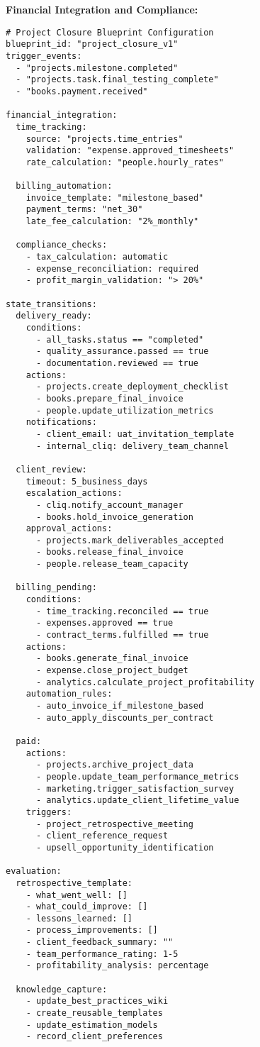 \textbf{Financial Integration and Compliance:}
\begin{verbatim}
# Project Closure Blueprint Configuration
blueprint_id: "project_closure_v1"
trigger_events:
  - "projects.milestone.completed"
  - "projects.task.final_testing_complete"
  - "books.payment.received"

financial_integration:
  time_tracking:
    source: "projects.time_entries"
    validation: "expense.approved_timesheets"
    rate_calculation: "people.hourly_rates"
  
  billing_automation:
    invoice_template: "milestone_based"
    payment_terms: "net_30"
    late_fee_calculation: "2%_monthly"
    
  compliance_checks:
    - tax_calculation: automatic
    - expense_reconciliation: required
    - profit_margin_validation: "> 20%"

state_transitions:
  delivery_ready:
    conditions:
      - all_tasks.status == "completed"
      - quality_assurance.passed == true
      - documentation.reviewed == true
    actions:
      - projects.create_deployment_checklist
      - books.prepare_final_invoice
      - people.update_utilization_metrics
    notifications:
      - client_email: uat_invitation_template
      - internal_cliq: delivery_team_channel
      
  client_review:
    timeout: 5_business_days
    escalation_actions:
      - cliq.notify_account_manager
      - books.hold_invoice_generation
    approval_actions:
      - projects.mark_deliverables_accepted
      - books.release_final_invoice
      - people.release_team_capacity
      
  billing_pending:
    conditions:
      - time_tracking.reconciled == true
      - expenses.approved == true
      - contract_terms.fulfilled == true
    actions:
      - books.generate_final_invoice
      - expense.close_project_budget
      - analytics.calculate_project_profitability
    automation_rules:
      - auto_invoice_if_milestone_based
      - auto_apply_discounts_per_contract
      
  paid:
    actions:
      - projects.archive_project_data
      - people.update_team_performance_metrics
      - marketing.trigger_satisfaction_survey
      - analytics.update_client_lifetime_value
    triggers:
      - project_retrospective_meeting
      - client_reference_request
      - upsell_opportunity_identification

evaluation:
  retrospective_template:
    - what_went_well: []
    - what_could_improve: []
    - lessons_learned: []
    - process_improvements: []
    - client_feedback_summary: ""
    - team_performance_rating: 1-5
    - profitability_analysis: percentage
    
  knowledge_capture:
    - update_best_practices_wiki
    - create_reusable_templates
    - update_estimation_models
    - record_client_preferences
\end{verbatim}

